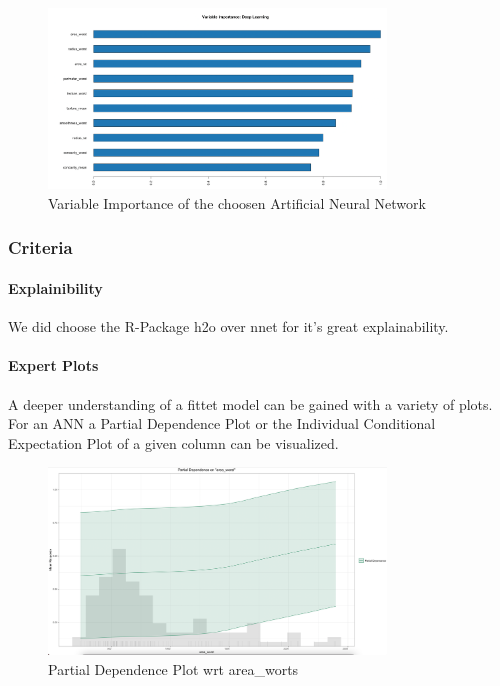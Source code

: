 \documentclass[]{article}
\let\oldparagraph\paragraph
\renewcommand{\paragraph}[1]{\oldparagraph{#1}\mbox{}}
\begin{document}
\begin{figure}
    \centering
    \includegraphics[width=0.8\textwidth]{images/variable_importance.png}
    \caption{Variable Importance of the choosen Artificial Neural Network}
    \label{fig:variable_importance}
\end{figure}

\subsubsection{Criteria}\label{criteria}

\paragraph{Explainibility}\label{explainibility}

We did choose the R-Package h2o over nnet for it's great explainability.

\paragraph{Expert Plots}\label{expert-plots}

A deeper understanding of a fittet model can be gained with a variety of
plots. For an ANN a Partial Dependence Plot or the Individual
Conditional Expectation Plot of a given column can be visualized.

\begin{figure}
    \centering
    \includegraphics[width=0.8\textwidth]{images/pd_plot.png}
    \caption{Partial Dependence Plot wrt area\_worts}
    \label{fig:pd_plot}
\end{figure}
\end{document}
